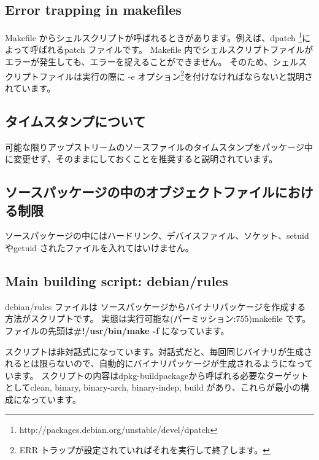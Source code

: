 \documentclass[mingoth,a4paper]{jsarticle}
\begin{document}
\subsection{Error trapping in makefiles}
 Makefile からシェルスクリプトが呼ばれるときがあります。例えば、dpatch \footnote{http://packages.debian.org/unstable/devel/dpatch}によって呼ばれるpatch ファイルです。
 Makefile 内でシェルスクリプトファイルがエラーが発生しても、エラーを捉えることができません。
 そのため、シェルスクリプトファイルは実行の際に -e オプション\footnote{ERR トラップが設定されていればそれを実行して終了します。}を付けなければならないと説明されています。

\subsection{タイムスタンプについて}
可能な限りアップストリームのソースファイルのタイムスタンプをパッケージ中に変更せず、そのままにしておくことを推奨すると説明されています。

\subsection{ソースパッケージの中のオブジェクトファイルにおける制限}
ソースパッケージの中にはハードリンク、デバイスファイル、ソケット、setuid やgetuid されたファイルを入れてはいけません。

\subsection{Main building script: debian/rules}
debian/rules ファイルは ソースパッケージからバイナリパッケージを作成する方法がスクリプトです。
実態は実行可能な(パーミッション:755)makefile です。
ファイルの先頭は{\bf \#!/usr/bin/make -f} になっています。

スクリプトは非対話式になっています。対話式だと、毎回同じバイナリが生成されるとは限らないので、自動的にバイナリパッケージが生成されるようになっています。
スクリプトの内容はdpkg-buildpackageから呼ばれる必要なターゲットとしてclean, binary, binary-arch, binary-indep, build があり、これらが最小の構成になっています。
\end{document}
